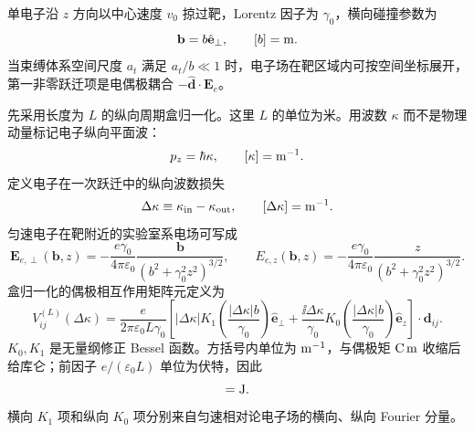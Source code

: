 单电子沿 $z$ 方向以中心速度 $v_0$ 掠过靶，Lorentz 因子为 $\gamma_0$，横向碰撞参数为
\begin{equation*}
\mathbf b=b\hat{\mathbf e}_\perp,
\qquad [b]={\rm m}.
\end{equation*}
当束缚体系空间尺度 $a_t$ 满足 $a_t/b\ll1$ 时，电子场在靶区域内可按空间坐标展开，第一非零跃迁项是电偶极耦合 $-\hat{\mathbf d}\cdot\mathbf E_e$。

先采用长度为 $L$ 的纵向周期盒归一化。这里 $L$ 的单位为米。用波数 $\kappa$ 而不是物理动量标记电子纵向平面波：
\begin{equation*}
p_z=\hbar \kappa,
\qquad [\kappa]={\rm m^{-1}}.
\end{equation*}
定义电子在一次跃迁中的纵向波数损失
\begin{equation*}
\Delta\kappa\equiv \kappa_{\rm in}-\kappa_{\rm out},
\qquad [\Delta\kappa]={\rm m^{-1}}.
\end{equation*}
匀速电子在靶附近的实验室系电场可写成
\begin{equation}
\boxed{
\mathbf E_{e,\perp}(\mathbf b,z)
=-\frac{e\gamma_0}{4\pi\varepsilon_0}
\frac{\mathbf b}{(b^2+\gamma_0^2z^2)^{3/2}},
\qquad
E_{e,z}(\mathbf b,z)
=-\frac{e\gamma_0}{4\pi\varepsilon_0}
\frac{z}{(b^2+\gamma_0^2z^2)^{3/2}}.}
\label{eq:uniform_electron_boosted_coulomb_field}
\end{equation}
盒归一化的偶极相互作用矩阵元定义为
\begin{equation}
\boxed{
 V_{ij}^{(L)}(\Delta\kappa)
=\frac{e}{2\pi\varepsilon_0L\gamma_0}
\left[
|\Delta\kappa|K_1\!\left(\frac{|\Delta\kappa|b}{\gamma_0}\right)
\hat{\mathbf e}_\perp
+\frac{\ii\Delta\kappa}{\gamma_0}
K_0\!\left(\frac{|\Delta\kappa|b}{\gamma_0}\right)
\hat{\mathbf e}_z
\right]\cdot\mathbf d_{ij}.}
\label{eq:feberi_bessel_coulomb_matrix_element}
\end{equation}
$K_0,K_1$ 是无量纲修正 Bessel 函数。方括号内单位为 ${\rm m^{-1}}$，与偶极矩 ${\rm C\,m}$ 收缩后给库仑；前因子 $e/(\varepsilon_0L)$ 单位为伏特，因此
\begin{equation*}
[V_{ij}^{(L)}]={\rm J}.
\end{equation*}
横向 $K_1$ 项和纵向 $K_0$ 项分别来自匀速相对论电子场的横向、纵向 Fourier 分量。

